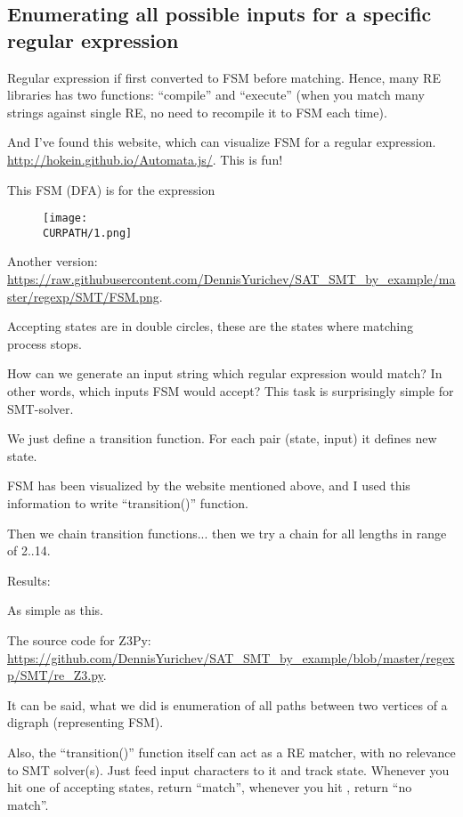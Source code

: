 \subsection{Enumerating all possible inputs for a specific regular expression}

\renewcommand{\CURPATH}{regexp/SMT}

Regular expression if first converted to \ac{FSM} before matching.
Hence, many \ac{RE} libraries has two functions: ``compile'' and ``execute''
(when you match many strings against single \ac{RE}, no need to recompile it to \ac{FSM} each time).

And I've found this website, which can visualize \ac{FSM} for a regular expression.
\url{http://hokein.github.io/Automata.js/}.
This is fun!

This \ac{FSM} (\ac{DFA}) is for the expression 

\begin{figure}[H]
\centering
\texttt{[image: \\CURPATH/1.png]}
\caption{}
\end{figure}

Another version: \url{https://raw.githubusercontent.com/DennisYurichev/SAT_SMT_by_example/master/regexp/SMT/FSM.png}.

Accepting states are in double circles, these are the states where matching process stops.

How can we generate an input string which regular expression would match?
In other words, which inputs \ac{FSM} would accept?
This task is surprisingly simple for SMT-solver.

We just define a transition function.
For each pair (state, input) it defines new state.

\ac{FSM} has been visualized by the website mentioned above, and I used this information to write ``transition()'' function.

Then we chain transition functions... then we try a chain for all lengths in range of 2..14.



Results:



As simple as this.

The source code for Z3Py: \url{https://github.com/DennisYurichev/SAT_SMT_by_example/blob/master/regexp/SMT/re_Z3.py}.

It can be said, what we did is enumeration of all paths between two vertices of a digraph (representing \ac{FSM}).

Also, the ``transition()'' function itself can act as a RE matcher, with no relevance to SMT solver(s).
Just feed input characters to it and track state.
Whenever you hit one of accepting states, return ``match'', whenever you hit , return ``no match''.

